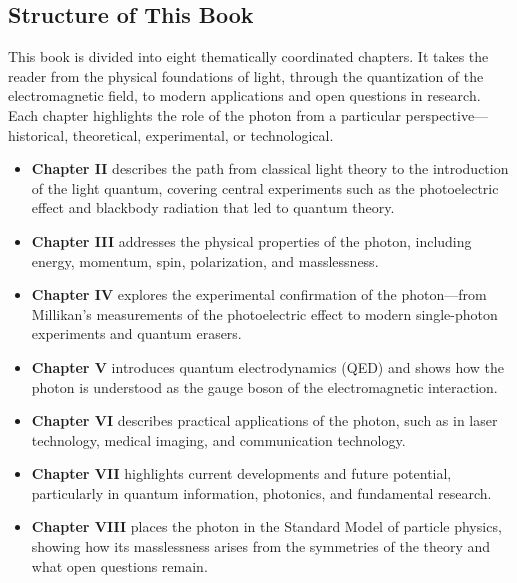 \subsection{Structure of This Book}
This book is divided into eight thematically coordinated chapters. It takes the reader from the physical foundations of light, through the quantization of the electromagnetic field, to modern applications and open questions in research. Each chapter highlights the role of the photon from a particular perspective—historical, theoretical, experimental, or technological.

\begin{itemize}
	\item \textbf{Chapter II} describes the path from classical light theory to the introduction of the light quantum, covering central experiments such as the photoelectric effect and blackbody radiation that led to quantum theory.
	
	\item \textbf{Chapter III} addresses the physical properties of the photon, including energy, momentum, spin, polarization, and masslessness.
	
	\item \textbf{Chapter IV} explores the experimental confirmation of the photon—from Millikan’s measurements of the photoelectric effect to modern single-photon experiments and quantum erasers.
	
	\item \textbf{Chapter V} introduces quantum electrodynamics (QED) and shows how the photon is understood as the gauge boson of the electromagnetic interaction.
	
	\item \textbf{Chapter VI} describes practical applications of the photon, such as in laser technology, medical imaging, and communication technology.
	
	\item \textbf{Chapter VII} highlights current developments and future potential, particularly in quantum information, photonics, and fundamental research.
	
	\item \textbf{Chapter VIII} places the photon in the Standard Model of particle physics, showing how its masslessness arises from the symmetries of the theory and what open questions remain.
\end{itemize}

